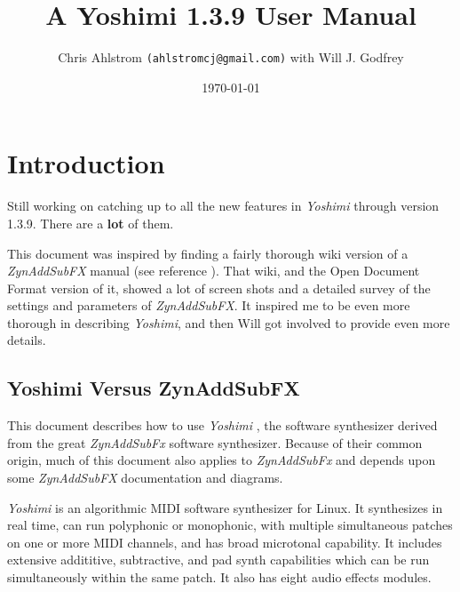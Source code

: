 \documentclass[
 11pt,
 twoside,
 a4paper,
 final                                 %
]{article}
\begin{document}
\title{A Yoshimi 1.3.9 User Manual}
\author{Chris Ahlstrom \texttt{(ahlstromcj@gmail.com)} with Will J. Godfrey}
\date{\today}
\maketitle
\tableofcontents
\listoffigures                         %
\listoftables                          %


\setlength{\parindent}{0pt}
\setlength{\parskip}{1ex plus 0.5ex minus 0.2ex}

\section{Introduction}
\label{sec:introduction}

   Still working on catching up to all the new features in \textsl{Yoshimi}
   through version 1.3.9.
   There are a \textbf{lot} of them.

   This document was inspired by finding a fairly thorough wiki version of a
   \textsl{ZynAddSubFX} manual (see reference \cite{zynwiki}).  That wiki,
   and the Open Document Format version of it, showed a lot of screen
   shots and a detailed survey of the settings and parameters of
   \textsl{ZynAddSubFX}.  It inspired me to be even more thorough in
   describing \textsl{Yoshimi}, and then Will got involved to provide even more
   details.

\subsection{Yoshimi Versus ZynAddSubFX}
\label{subsec:introduction_yoshimi_vs_zyn}

   This document describes how to use \textsl{Yoshimi} \cite{yoshimi},
   the software synthesizer derived from the great
   \textsl{ZynAddSubFx} \cite{zynaddsubfx} software
   synthesizer.  Because of their common origin, much of this document also
   applies to \textsl{ZynAddSubFx} and depends upon some \textsl{ZynAddSubFX}
   documentation and diagrams.

   \textsl{Yoshimi} is an algorithmic MIDI software synthesizer for Linux.
   It synthesizes in real time, can run polyphonic or monophonic, with multiple
   simultaneous patches on one or more MIDI channels, and has broad microtonal
   capability. It includes extensive addititive, subtractive,
   and pad synth capabilities which can be run simultaneously within the
   same patch.  It also has eight audio effects modules.
\end{document}
